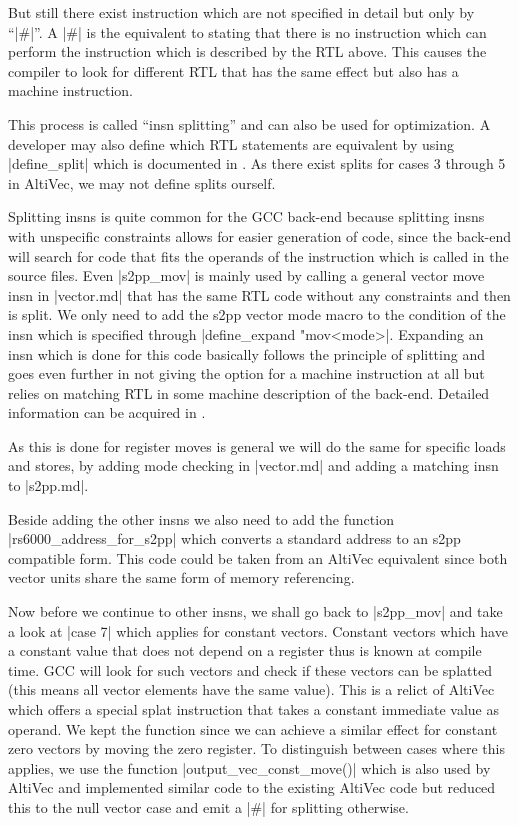 But still there exist instruction which are not specified in detail but only by ``|#|''.
A |#| is the equivalent to stating that there is no instruction which can perform the instruction which is described by the RTL above.
This causes the compiler to look for different RTL that has the same effect but also has a machine instruction.

This process is called ``insn splitting'' and can also be used for optimization.
A developer may also define which RTL statements are equivalent by using |define_split| which is documented in \cite{GCCint:definesplit}.
As there exist splits for cases 3 through 5 in AltiVec, we may not define splits ourself.

Splitting insns is quite common for the GCC back-end because splitting insns with unspecific constraints allows for easier generation of code, since the back-end will search for code that fits the operands of the instruction which is called in the source files.
Even |s2pp_mov| is mainly used by calling a general vector move insn in |vector.md| that has the same RTL code without any constraints and then is split.
We only need to add the s2pp vector mode macro to the condition of the insn which is specified through |define_expand "mov<mode>|.
Expanding an insn which is done for this code basically follows the principle of splitting and goes even further in not giving the option for a machine instruction at all but relies on matching RTL in some machine description of the back-end.
Detailed information can be acquired in \cite{GCCint:defineexpand}.

As this is done for register moves is general we will do the same for specific loads and stores, by adding mode checking in |vector.md| and adding a matching insn to |s2pp.md|.

Beside adding the other insns we also need to add the function |rs6000_address_for_s2pp| which converts a standard address to an s2pp compatible form.
This code could be taken from an AltiVec equivalent since both vector units share the same form of memory referencing.

Now before we continue to other insns, we shall go back to |s2pp_mov| and take a look at |case 7| which applies for constant vectors.
Constant vectors which have a constant value that does not depend on a register thus is known at compile time.
GCC will look for such vectors and check if these vectors can be splatted (this means all vector elements have the same value).
This is a relict of AltiVec which offers a special splat instruction that takes a constant immediate value as operand.
We kept the function since we can achieve a similar effect for constant zero vectors by moving the zero register.
To distinguish between cases where this applies, we use the function |output_vec_const_move()| which is also used by AltiVec and implemented similar code to the existing AltiVec code but reduced this to the null vector case and emit a |#| for splitting otherwise.

